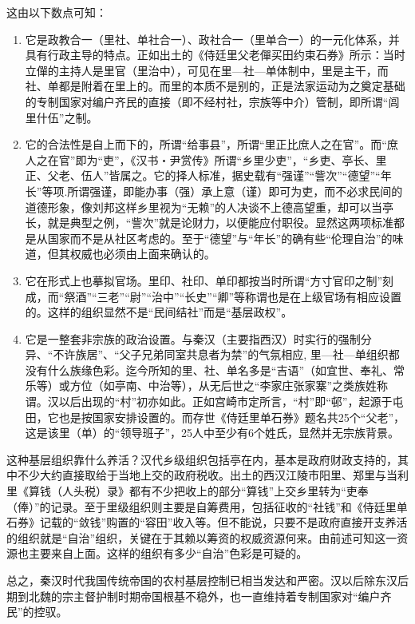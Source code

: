 \documentclass[a4paper,12pt,punct=kaiming,fontset=none]{ctexart}
\begin{document}
这由以下数点可知：
\begin{enumerate}
\item 它是政教合一（里社、单社合一）、政社合一（里单合一）的一元化体系，并具有行政主导的特点。正如出土的《侍廷里父老僤买田约束石券》所示：当时立僤的主持人是里官（里治中），可见在里—社—单体制中，里是主干，而社、单都是附着在里上的。而里的本质不是别的，正是法家运动为之奠定基础的专制国家对编户齐民的直接（即不经村社，宗族等中介）管制，即所谓“闾里什伍”之制。

\item 它的合法性是自上而下的，所谓“给事县”，所谓“里正比庶人之在官”。而“庶人之在官”即为“吏”，《汉书・尹赏传》所谓“乡里少吏”，“乡吏、亭长、里正、父老、伍人”皆属之。它的择人标准，据史载有“强谨”“訾次”“德望”“年长”等项.所谓强谨，即能办事（强）承上意（谨）即可为吏，而不必求民间的道德形象，像刘邦这样乡里视为“无赖”的人决谈不上德高望重，却可以当亭长，就是典型之例，“訾次”就是论财力，以便能应付职役。显然这两项标准都是从国家而不是从社区考虑的。至于“德望”与“年长”的确有些“伦理自治”的味道，但其权威也必须由上面来确认的。

\item 它在形式上也摹拟官场。里印、社印、单印都按当时所谓“方寸官印之制”刻成，而“祭酒”“三老”“尉”“治中”“长史”“卿”等称谓也是在上级官场有相应设置的。这样的组织显然不是“民间结社”而是“基层政权”。

\item 它是一整套非宗族的政治设置。与秦汉（主要指西汉）时实行的强制分异、“不许族居”、“父子兄弟同室共息者为禁”的气氛相应, 里—社—单组织都没有什么族缘色彩。迄今所知的里、社、单名多是“吉语”（如宜世、奉礼、常乐等）或方位（如亭南、中治等），从无后世之“李家庄张家寨”之类族姓称谓。汉以后出现的“村”初亦如此。正如宫崎市定所言，“村”即“邨”，起源于屯田，它也是按国家安排设置的。而存世《侍廷里单石券》题名共25个“父老”，这是该里（单）的“领导班子”，25人中至少有6个姓氏，显然并无宗族背景。
\end{enumerate}

这种基层组织靠什么养活？汉代乡级组织包括亭在内，基本是政府财政支持的，其中不少大约直接取给于当地上交的政府税收。出土的西汉江陵市阳里、郑里与当利里《算钱（人头税）录》都有不少把收上的部分“算钱”上交乡里转为“吏奉（俸）”的记录。至于里级组织则主要是自筹费用，包括征收的“社钱”和《侍廷里单石券》记载的“敛钱”购置的“容田”收入等。但不能说，只要不是政府直接开支养活的组织就是“自治”组织，关键在于其赖以筹资的权威资源何来。由前述可知这一资源也主要来自上面。这样的组织有多少“自治”色彩是可疑的。

总之，秦汉时代我国传统帝国的农村基层控制已相当发达和严密。汉以后除东汉后期到北魏的宗主督护制时期帝国根基不稳外，也一直维持着专制国家对“编户齐民”的控驭。
\end{document}
